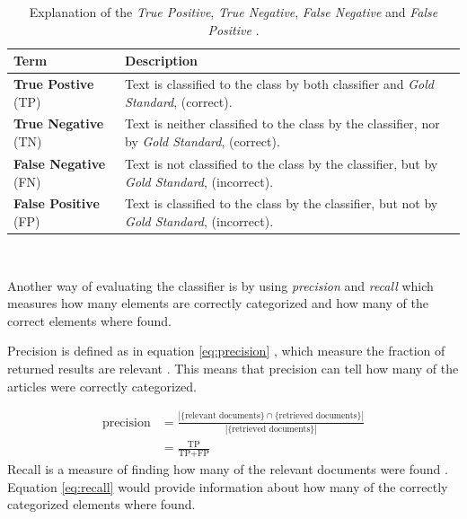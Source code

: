 \begin{table}[ht]
\centering
\renewcommand{\arraystretch}{1.25}
\begin{tabularx}{\textwidth}{l |X}
\textbf{Term}  & \textbf{Description} \\\hline
\textbf{True Postive} (TP) & Text is classified to the class by both classifier and \emph{Gold Standard}, (correct). \\ \hline
\textbf{True Negative} (TN) &  Text is neither classified to the class by the classifier, nor by \emph{Gold Standard}, (correct).  \\ \hline
\textbf{False Negative} (FN) & Text is not classified to the class by the classifier, but by \emph{Gold Standard}, (incorrect). \\ \hline
\textbf{False Positive} (FP) & Text is classified to the class by the classifier, but not by \emph{Gold Standard}, (incorrect).
\end{tabularx}
\\[10pt]
\caption{Explanation of the \emph{True Positive}, \emph{True Negative}, \emph{False Negative} and \emph{False Positive} \cite[p.~330-331]{iirbook}.}
\label{tab:}
\end{table}

Another way of evaluating the classifier is by using \emph{precision} and \emph{recall} which measures how many elements are correctly categorized and how many of the correct elements where found. 


Precision is defined as in equation \ref{eq:precision} \cite{wiki:precisionrecall}, which measure the fraction of returned results are relevant \cite[p.~5]{iirbook}. This means that precision can tell how many of the articles were correctly categorized. 

\begin{equation} \label{eq:precision} 
\begin{split}
\text{precision} & =\frac{|\{\text{relevant documents}\}\cap\{\text{retrieved documents}\}|}{|\{\text{retrieved documents}\}|} \\
 & = \frac{\text{TP}}{\text{TP} + \text{FP}}
 \end{split}
\end{equation}
Recall is a measure of finding how many of the relevant documents were found \cite[p.~5]{iirbook}. Equation \ref{eq:recall} \cite{wiki:precisionrecall} would provide information about how many of the correctly categorized elements where found. 

